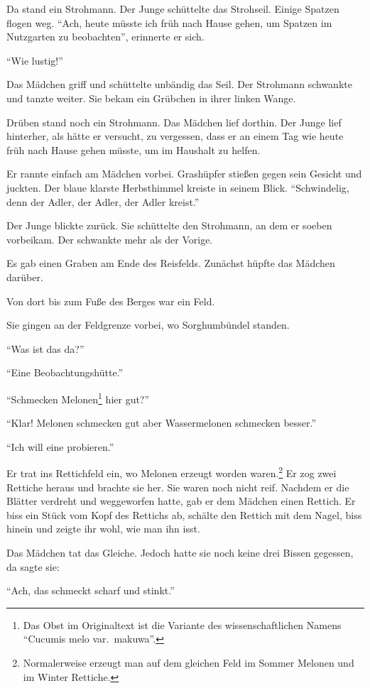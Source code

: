 \documentclass[prd,a4paper,12pt,tightenlines,notitlepage,nofootinbib]{revtex4-1}
\begin{document}
Da stand ein Strohmann.  Der Junge schüttelte das Strohseil.  Einige
Spatzen flogen weg.  "`Ach, heute müsste ich früh nach Hause gehen, um
Spatzen im Nutzgarten zu beobachten"', erinnerte er sich.

"`Wie lustig!"'

Das Mädchen griff und schüttelte unbändig das Seil.  Der Strohmann schwankte und
tanzte weiter.  Sie bekam ein Grübchen in ihrer linken Wange.

Drüben
stand noch ein Strohmann.  Das Mädchen lief dorthin.  Der Junge lief hinterher,
als hätte er versucht, zu vergessen, dass er an einem Tag wie heute
früh nach Hause gehen müsste, um im Haushalt zu helfen.

Er rannte
einfach am Mädchen vorbei.  Grashüpfer stießen gegen sein
Gesicht und juckten.  Der blaue klarste Herbsthimmel kreiste in seinem Blick.
"`Schwindelig, denn der Adler, der Adler, der Adler kreist."'

Der Junge blickte
zurück.  Sie schüttelte den Strohmann, an dem er soeben vorbeikam.  Der
schwankte mehr als der Vorige.

Es gab einen Graben am Ende des
Reisfelds.  Zunächst hüpfte das Mädchen darüber.

Von dort bis zum Fuße
des Berges war ein Feld.

Sie gingen an der Feldgrenze vorbei, wo
Sorghumbündel standen.

"`Was ist das da?"'

"`Eine Beobachtungshütte."'

"`Schmecken Melonen\footnote{
  Das Obst im Originaltext ist die Variante des wissenschaftlichen Namens
  "`Cucumis melo var.\ makuwa"'.}
hier gut?"'

"`Klar!  Melonen schmecken gut aber Wassermelonen schmecken besser."'

"`Ich will eine probieren."'

Er trat ins Rettichfeld ein, wo Melonen erzeugt worden waren.\footnote{
Normalerweise erzeugt man auf dem gleichen Feld
im Sommer Melonen und im Winter Rettiche.}
Er zog
zwei Rettiche heraus und brachte sie her.  Sie waren noch nicht reif.
Nachdem er die Blätter verdreht und weggeworfen hatte, gab er dem Mädchen einen
Rettich.  Er biss ein Stück vom Kopf des Rettichs ab, schälte den
Rettich mit dem Nagel, biss hinein und zeigte ihr wohl, wie man ihn
isst.

Das Mädchen tat das Gleiche.  Jedoch hatte sie noch keine drei
Bissen gegessen, da sagte sie:

"`Ach, das schmeckt scharf und stinkt."'
\end{document}

